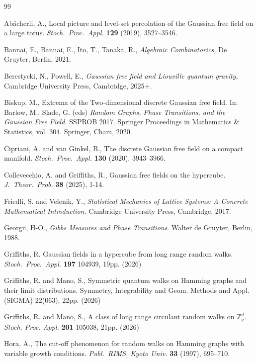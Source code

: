 \documentclass[a4paper,11pt]{article}
\theoremstyle{plain}
\theoremstyle{definition}
\begin{document}
\begin{thebibliography}{99}

  Ab\"acherli, A.,
  Local picture and level-set percolation of the Gaussian
  free field on a large torus.
  {\it Stoch.\ Proc.\ Appl.} {\bf 129} (2019),
  3527--3546.

  Bannai, E., Bannai, E., Ito, T., Tanaka, R.,
  {\it Algebraic Combinatorics,}
  De Gruyter, Berlin, 2021.

  Berestycki, N., Powell, E.,
  {\it Gaussian free field and Liouville quantum gravity,}
  Cambridge University Press, Cambridge, 2025+.

  Biskup, M.,
  Extrema of the Two-dimensional discrete Gaussian free
  field. In: Barlow, M., Slade, G. (eds)
  {\it Random Graphs, Phase Transitions, and the Gaussian
  Free Field.} SSPROB 2017. Springer Proceedings in Mathematics
  \& Statistics, vol. 304.   
  Springer, Cham, 2020.

  Cipriani, A. and van Ginkel, B.,
  The discrete Gaussian free field on a compact manifold.
  {\it Stoch.\ Proc.\ Appl.} {\bf 130} (2020),
  3943--3966.

  Collevecchio, A. and Griffiths, R.,
  Gaussian free fields on the hypercube.
  {\it J.\ Theor.\ Prob.} {\bf 38} (2025),
  1-14.

  Friedli, S. and Velenik, Y.,
  {\it Statistical Mechanics of Lattice Systems:
    A Concrete Mathematical Introduction}.
  Cambridge University Press, Cambridge, 2017.

  Georgii, H-O.,
  {\it Gibbs Measures and Phase Transitions}.
  Walter de Gruyter, Berlin, 1988.

  Griffiths, R. Gaussian fields in a hypercube from long range
  random walks.
  {\it Stoch.\ Proc.\ Appl.} {\bf 197} 104939, 19pp. (2026)
  
  Griffiths, R. and Mano, S.,
  Symmetric quantum walks on Hamming graphs and their limit
  distributions. 
  Symmetry, Integrability and Geom. Methods and Appl. (SIGMA)
  22(063), 22pp. (2026)

  Griffiths, R. and Mano, S.,
  A class of long range circulant random walks on $\mathbb{Z}_q^d$.
  {\it Stoch. Proc. Appl.} {\bf 201} 105038, 21pp. (2026) 

  Hora, A.,
  The cut-off phenomenon for random walks on Hamming
  graphs with variable growth conditions.
  {\it Publ.\ RIMS, Kyoto Univ.} {\bf 33} (1997), 695--710.

\end{thebibliography}
\end{document}
